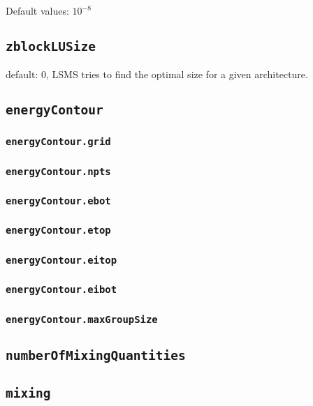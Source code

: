 Default values: $10^{-8}$

\subsection{\texttt{zblockLUSize}}
default: 0, LSMS tries to find the optimal size for a given architecture.

\subsection{\texttt{energyContour}}

\subsubsection{\texttt{energyContour.grid}}

\subsubsection{\texttt{energyContour.npts}}

\subsubsection{\texttt{energyContour.ebot}}

\subsubsection{\texttt{energyContour.etop}}

\subsubsection{\texttt{energyContour.eitop}}

\subsubsection{\texttt{energyContour.eibot}}

\subsubsection{\texttt{energyContour.maxGroupSize}}

\subsection{\texttt{numberOfMixingQuantities}}

\subsection{\texttt{mixing}}

